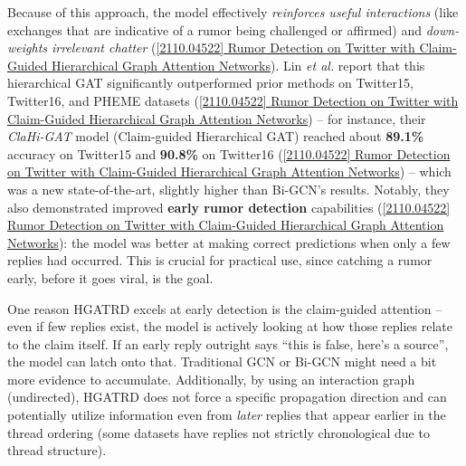 \documentclass[12pt,a4paper]{report}
\begin{document}
Because of this approach, the model effectively \textit{reinforces useful interactions} (like exchanges that are indicative of a rumor being challenged or affirmed) and \textit{down-weights irrelevant chatter} (\href{https://arxiv.org/abs/2110.04522#:~:text=alleviating%20the%20negative%20impact%20imposed,for%20detecting%20rumors%20at%20early}{[2110.04522] Rumor Detection on Twitter with Claim-Guided Hierarchical Graph Attention Networks}). Lin \textit{et al.} report that this hierarchical GAT significantly outperformed prior methods on Twitter15, Twitter16, and PHEME datasets (\href{https://arxiv.org/abs/2110.04522#:~:text=Claim,for%20detecting%20rumors%20at%20early}{[2110.04522] Rumor Detection on Twitter with Claim-Guided Hierarchical Graph Attention Networks}) – for instance, their \textit{ClaHi-GAT} model (Claim-guided Hierarchical GAT) reached about \textbf{89.1\%} accuracy on Twitter15 and \textbf{90.8\%} on Twitter16 (\href{https://ar5iv.org/pdf/2110.04522#:~:text=Method%20Twitter15%20Twitter16%20PHEME%20Acc,GAT%2FDT%200.813%200.848%200.837}{[2110.04522] Rumor Detection on Twitter with Claim-Guided Hierarchical Graph Attention Networks}) – which was a new state-of-the-art, slightly higher than Bi-GCN’s results. Notably, they also demonstrated improved \textbf{early rumor detection} capabilities (\href{https://arxiv.org/abs/2110.04522#:~:text=Claim,for%20detecting%20rumors%20at%20early}{[2110.04522] Rumor Detection on Twitter with Claim-Guided Hierarchical Graph Attention Networks}): the model was better at making correct predictions when only a few replies had occurred. This is crucial for practical use, since catching a rumor early, before it goes viral, is the goal.

One reason HGATRD excels at early detection is the claim-guided attention – even if few replies exist, the model is actively looking at how those replies relate to the claim itself. If an early reply outright says “this is false, here’s a source”, the model can latch onto that. Traditional GCN or Bi-GCN might need a bit more evidence to accumulate. Additionally, by using an interaction graph (undirected), HGATRD does not force a specific propagation direction and can potentially utilize information even from \textit{later} replies that appear earlier in the thread ordering (some datasets have replies not strictly chronological due to thread structure).
\end{document}

